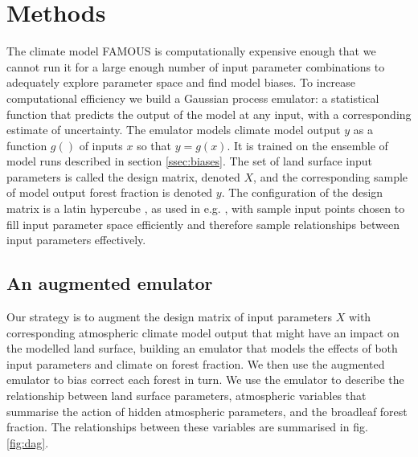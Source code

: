 \documentclass[gmd, manuscript]{copernicus}
\begin{document}
\section{Methods}\label{sec:methods}
The climate model FAMOUS is computationally expensive enough that we cannot run it for a large enough number of input parameter combinations to adequately explore parameter space and find model biases. To increase computational efficiency we build a Gaussian process emulator: a statistical function that predicts the output of the model at any input, with a corresponding estimate of uncertainty. The emulator models climate model output $y$ as a function $g()$ of inputs $x$ so that $y = g(x)$. It is trained on the ensemble of model runs described in section \ref{ssec:biases}. The set of land surface input parameters is called the design matrix, denoted $X$, and the corresponding sample of model output forest fraction is denoted $y$. The configuration of the design matrix is a latin hypercube \citep{mckay1979comparison}, as used in e.g. \cite{gregoire2010optimal,williams2013optimising}, with sample input points chosen to fill input parameter space efficiently and therefore sample relationships between input parameters effectively.

\subsection{An augmented emulator}\label{ssec:augmented}
Our strategy is to augment the design matrix of input parameters $X$ with corresponding atmospheric climate model output that might have an impact on the modelled land surface, building an emulator that models the effects of both input parameters and climate on forest fraction. We then use the augmented emulator to bias correct each forest in turn. We use the emulator to describe the relationship between land surface parameters, atmospheric variables that summarise the action of hidden atmospheric parameters, and the broadleaf forest fraction. The relationships between these variables are summarised in fig. \ref{fig:dag}. 
\end{document}
